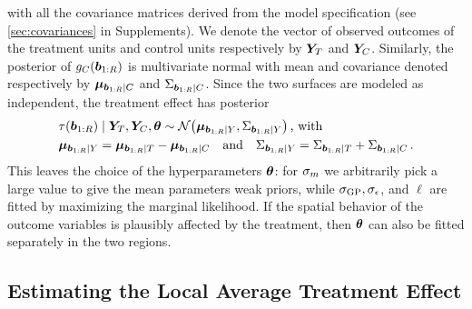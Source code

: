 \documentclass{article}
\newcommand{\autorefexternal}[1]{\autoref*{#1}}
\begin{document}
with all the covariance matrices derived from the model specification (see \autorefexternal{sec:covariances} in Supplements).
We denote the vector of observed outcomes of the treatment units and control units respectively by \(\bm{Y}_{T}\) and \(\bm{Y}_{C}\).
Similarly, the posterior of \(g_C{}(\bm{b}_{1:R})\) is multivariate normal with mean and covariance denoted respectively by \(\bm{\mu}_{\bm{b}_{1:R} \mid C}\) and \(\Sigma_{\bm{b}_{1:R} \mid C}\).
Since the two surfaces are modeled as independent, the treatment effect has posterior
\begin{equation}
    \begin{split}
        & \tau(\sentinels) \mid \yt, \yc, \hyperparam \sim \normal\del{\muvec_{\sentinels \mid Y}, \Sigma_{\sentinels \mid Y}} \,\text{, with}\\
        & \muvec_{\sentinels \mid Y} = \muvec_{\sentinels \mid \treat} - \muvec_{\sentinels \mid \ctrol} \quad\text{and}\quad
        \Sigma_{\sentinels \mid Y} = \Sigma_{\sentinels \mid \treat} + \Sigma_{\sentinels \mid \ctrol} \,.
    \end{split}
    \label{eq:postvar2gp}
\end{equation}
This leaves the choice of the hyperparameters \(\bm{\theta}\):
for \(\sigma_{m}\) we arbitrarily pick a large value to give the mean parameters weak priors, while \(\sigma_{\mathrm{GP}},\sigma_{\epsilon}\), and \(\ell\) are fitted by maximizing the marginal likelihood.
If the spatial behavior of the outcome variables is plausibly affected by the treatment, then \(\bm{\theta}\) can also be fitted separately in the two regions.

\subsection{Estimating the Local Average Treatment Effect}
\label{sec:ate}
\end{document}
